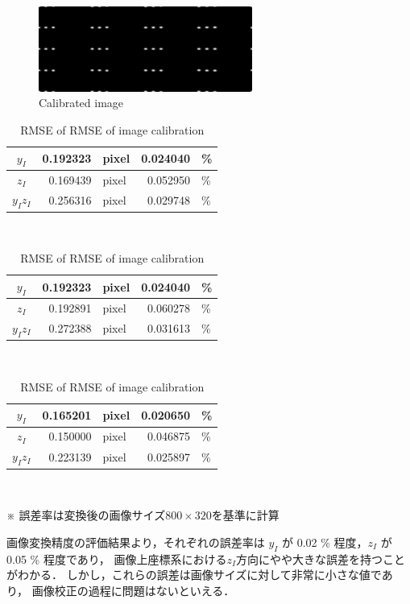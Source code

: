 \documentclass[twocolumn,a4j]{jsarticle}
\begin{document}
\begin{figure}[htbp]
  \centering
  \includegraphics[keepaspectratio, width=70mm]{../images/Calibration/0.bmp}
  \caption{Calibrated image}
\end{figure}

\begin{table}[hbtp]
  \centering
  \caption{RMSE of RMSE of image calibration}
  {
    \begin{tabular}{c r l r l}
      \hline
      $y_I$    & 0.192323 & pixel & 0.024040 & \% \\ \hline
      $z_I$    & 0.169439 & pixel & 0.052950 & \% \\ \hline
      $y_Iz_I$ & 0.256316 & pixel & 0.029748 & \% \\ \hline
    \end{tabular}\\
     \baselineskip
    \begin{tabular}{c r l r l}
      \hline
      $y_I$    & 0.192323 & pixel & 0.024040 & \% \\ \hline
      $z_I$    & 0.192891 & pixel & 0.060278 & \% \\ \hline
      $y_Iz_I$ & 0.272388 & pixel & 0.031613 & \% \\ \hline
    \end{tabular}\\
     \baselineskip
    \begin{tabular}{c r l r l}
      \hline
      $y_I$    & 0.165201 & pixel & 0.020650 & \% \\ \hline
      $z_I$    & 0.150000 & pixel & 0.046875 & \% \\ \hline
      $y_Iz_I$ & 0.223139 & pixel & 0.025897 & \% \\ \hline
    \end{tabular}\\
  }
   \baselineskip
  ※ 誤差率は変換後の画像サイズ$800\times320$を基準に計算
\end{table}
\newpage
画像変換精度の評価結果より，それぞれの誤差率は
$y_I$ が 0.02 \% 程度，$z_I$ が 0.05 \% 程度であり，
画像上座標系における$z_I$方向にやや大きな誤差を持つことがわかる．
しかし，これらの誤差は画像サイズに対して非常に小さな値であり，
画像校正の過程に問題はないといえる．
\end{document}

